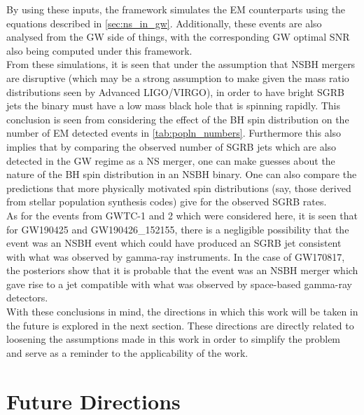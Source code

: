     By using these inputs, the framework simulates the EM counterparts using the
    equations described in \ref{sec:ns_in_gw}.  Additionally, these events are also
    analysed from the GW side of things, with the corresponding GW optimal SNR also
    being computed under this framework.\\
    From these simulations, it is seen that under the assumption that NSBH mergers are
    disruptive (which may be a strong assumption to make given the mass ratio
    distributions seen by Advanced LIGO/VIRGO), in order to have bright SGRB jets the
    binary must have a low mass black hole that is spinning rapidly. This conclusion is
    seen from considering the effect of the BH spin distribution on the number of EM
    detected events in \ref{tab:popln_numbers}. Furthermore this also implies that by
    comparing the observed number of SGRB jets which are also detected in the GW regime
    as a NS merger, one can make guesses about the nature of the BH spin distribution in
    an NSBH binary. One can also compare the predictions that more physically motivated
    spin distributions (say, those derived from stellar population synthesis codes) give
    for the observed SGRB rates.\\
    As for the events from GWTC-1 and 2 which were considered here, it is seen that for
    GW190425 and GW190426\_152155, there is a negligible possibility that the event was
    an NSBH event which could have produced an SGRB jet consistent with what was
    observed by gamma-ray instruments. In the case of GW170817, the posteriors show that
    it is probable that the event was an NSBH merger which gave rise to a jet compatible
    with what was observed by space-based gamma-ray detectors.\\
    With these conclusions in mind, the directions in which this work will be taken in
    the future is explored in the next section. These directions are directly related to
    loosening the assumptions made in this work in order to simplify the problem and
    serve as a reminder to the applicability of the work.

    \section{Future Directions}

